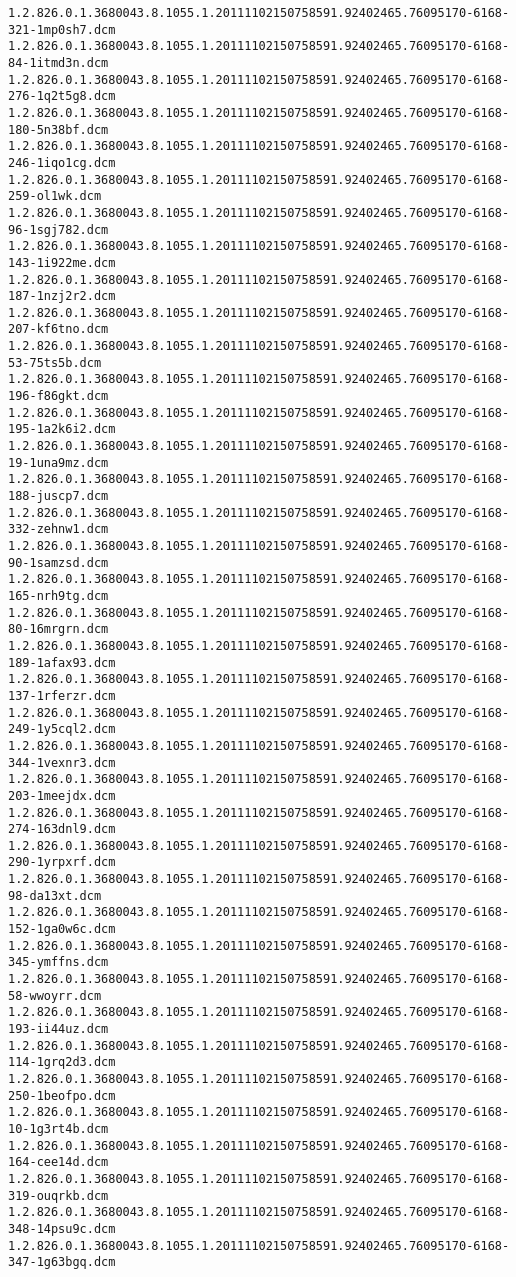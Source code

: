 \begin{lstlisting}
1.2.826.0.1.3680043.8.1055.1.20111102150758591.92402465.76095170-6168-321-1mp0sh7.dcm 1.2.826.0.1.3680043.8.1055.1.20111102150758591.92402465.76095170-6168-84-1itmd3n.dcm 1.2.826.0.1.3680043.8.1055.1.20111102150758591.92402465.76095170-6168-276-1q2t5g8.dcm 1.2.826.0.1.3680043.8.1055.1.20111102150758591.92402465.76095170-6168-180-5n38bf.dcm 1.2.826.0.1.3680043.8.1055.1.20111102150758591.92402465.76095170-6168-246-1iqo1cg.dcm 1.2.826.0.1.3680043.8.1055.1.20111102150758591.92402465.76095170-6168-259-ol1wk.dcm 1.2.826.0.1.3680043.8.1055.1.20111102150758591.92402465.76095170-6168-96-1sgj782.dcm 1.2.826.0.1.3680043.8.1055.1.20111102150758591.92402465.76095170-6168-143-1i922me.dcm 1.2.826.0.1.3680043.8.1055.1.20111102150758591.92402465.76095170-6168-187-1nzj2r2.dcm 1.2.826.0.1.3680043.8.1055.1.20111102150758591.92402465.76095170-6168-207-kf6tno.dcm 1.2.826.0.1.3680043.8.1055.1.20111102150758591.92402465.76095170-6168-53-75ts5b.dcm 1.2.826.0.1.3680043.8.1055.1.20111102150758591.92402465.76095170-6168-196-f86gkt.dcm 1.2.826.0.1.3680043.8.1055.1.20111102150758591.92402465.76095170-6168-195-1a2k6i2.dcm 1.2.826.0.1.3680043.8.1055.1.20111102150758591.92402465.76095170-6168-19-1una9mz.dcm 1.2.826.0.1.3680043.8.1055.1.20111102150758591.92402465.76095170-6168-188-juscp7.dcm 1.2.826.0.1.3680043.8.1055.1.20111102150758591.92402465.76095170-6168-332-zehnw1.dcm 1.2.826.0.1.3680043.8.1055.1.20111102150758591.92402465.76095170-6168-90-1samzsd.dcm 1.2.826.0.1.3680043.8.1055.1.20111102150758591.92402465.76095170-6168-165-nrh9tg.dcm 1.2.826.0.1.3680043.8.1055.1.20111102150758591.92402465.76095170-6168-80-16mrgrn.dcm 1.2.826.0.1.3680043.8.1055.1.20111102150758591.92402465.76095170-6168-189-1afax93.dcm 1.2.826.0.1.3680043.8.1055.1.20111102150758591.92402465.76095170-6168-137-1rferzr.dcm 1.2.826.0.1.3680043.8.1055.1.20111102150758591.92402465.76095170-6168-249-1y5cql2.dcm 1.2.826.0.1.3680043.8.1055.1.20111102150758591.92402465.76095170-6168-344-1vexnr3.dcm 1.2.826.0.1.3680043.8.1055.1.20111102150758591.92402465.76095170-6168-203-1meejdx.dcm 1.2.826.0.1.3680043.8.1055.1.20111102150758591.92402465.76095170-6168-274-163dnl9.dcm 1.2.826.0.1.3680043.8.1055.1.20111102150758591.92402465.76095170-6168-290-1yrpxrf.dcm 1.2.826.0.1.3680043.8.1055.1.20111102150758591.92402465.76095170-6168-98-da13xt.dcm 1.2.826.0.1.3680043.8.1055.1.20111102150758591.92402465.76095170-6168-152-1ga0w6c.dcm 1.2.826.0.1.3680043.8.1055.1.20111102150758591.92402465.76095170-6168-345-ymffns.dcm 1.2.826.0.1.3680043.8.1055.1.20111102150758591.92402465.76095170-6168-58-wwoyrr.dcm 1.2.826.0.1.3680043.8.1055.1.20111102150758591.92402465.76095170-6168-193-ii44uz.dcm 1.2.826.0.1.3680043.8.1055.1.20111102150758591.92402465.76095170-6168-114-1grq2d3.dcm 1.2.826.0.1.3680043.8.1055.1.20111102150758591.92402465.76095170-6168-250-1beofpo.dcm 1.2.826.0.1.3680043.8.1055.1.20111102150758591.92402465.76095170-6168-10-1g3rt4b.dcm 1.2.826.0.1.3680043.8.1055.1.20111102150758591.92402465.76095170-6168-164-cee14d.dcm 1.2.826.0.1.3680043.8.1055.1.20111102150758591.92402465.76095170-6168-319-ouqrkb.dcm 1.2.826.0.1.3680043.8.1055.1.20111102150758591.92402465.76095170-6168-348-14psu9c.dcm 1.2.826.0.1.3680043.8.1055.1.20111102150758591.92402465.76095170-6168-347-1g63bgq.dcm 
\end{lstlisting}
